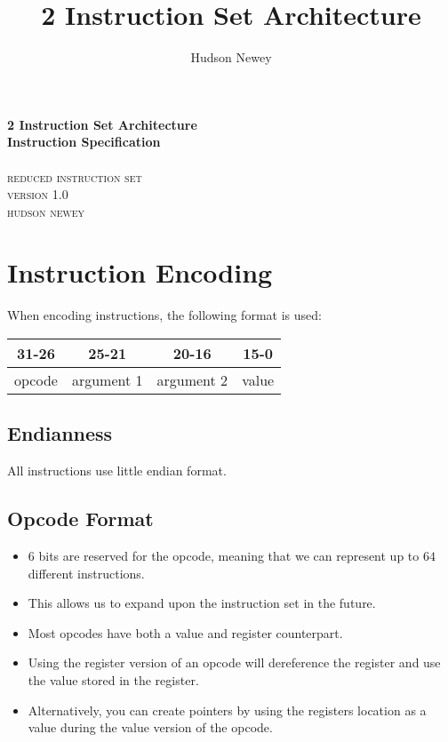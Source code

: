 \documentclass[12pt,a4paper]{article}
\title{ 2 Instruction Set Architecture }
\author{ Hudson Newey }
\begin{document}
\begin{center}
    \huge{\textbf{ 2 Instruction Set Architecture }} \\
    \huge{\textbf{ Instruction Specification }}\\
    \hspace{200pt}\\
    \textsc{ reduced instruction set } \\
    \textsc{ version 1.0 }
    \vspace{280pt}\\
    \textsc{ hudson newey }
\end{center}

\newpage
\tableofcontents
\newpage

\section{Instruction Encoding}

When encoding instructions, the following format is used:

\begin{center}
\begin{tabular}{ c c c c }
    \textbf{31-26} & \textbf{25-21} & \textbf{20-16} & \textbf{15-0} \\
    \hline
    opcode & argument 1 & argument 2 & value \\
\end{tabular}
\end{center}

\subsection{Endianness}

All instructions use little endian format.

\subsection{Opcode Format}

\begin{itemize}
    \item $6$ bits are reserved for the opcode, meaning that we can represent up to $64$
different instructions.
    \item This allows us to expand upon the instruction set in the future.
    \item Most opcodes have both a value and register counterpart.
    \item Using the register version of an opcode will dereference the register and use
the value stored in the register.
    \item Alternatively, you can create pointers by using the registers location as a
value during the value version of the opcode.
\end{itemize}
\end{document}
